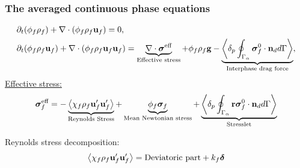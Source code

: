 \documentclass{sintefbeamer}
\begin{document}
\begin{frame}
  \frametitle{The averaged continuous phase equations}
\begin{align*}
  &\partial_t (\phi_f \rho_f)  
  + \mathbf{\nabla}\cdot (
      \phi_f \rho_f\textbf{u}_f
  )
  = 
  0,\\
  &\partial_t (\phi_f \rho_f\textbf{u}_f)
  + \mathbf{\nabla}\cdot 
      (\phi_f \rho_f\textbf{u}_f\textbf{u}_f)
  = 
  \underbrace{\mathbf{\nabla}\cdot \bm\sigma^\text{eff}}_\text{Effective stress}
  + \phi_f \rho_f \textbf{g} 
  - \underbrace{\left<\delta_p \oint_{\Gamma_{\alpha}} {\bm{\sigma}_f^0 \cdot \textbf{n}_d} d\Gamma\right>}_\text{Interphase drag force},
\end{align*}
\pause
\underline{Effective stress: } 
\begin{equation*}
  \bm{\sigma}_f^\text{eff}
  =
  - \underbrace{\avg{\chi_f\rho_f\textbf{u}_f'\textbf{u}_f'}}_\text{Reynolds Stress}
  + \underbrace{\phi_f \bm{\sigma}_f}_\text{Mean Newtonian stress}%
   + \underbrace{ {\pSavg{{\textbf{r}\bm{\sigma}_f^0 \cdot \textbf{n}_d}}}}_\text{Stresslet}
\end{equation*}
\pause

Reynolds stress decomposition: 
\begin{equation}
  \left<\chi_f\rho_f\textbf{u}_f'\textbf{u}_f'\right>
  = \text{Deviatoric part}
  + k_f \bm\delta
\end{equation}


\end{frame}
\end{document}
